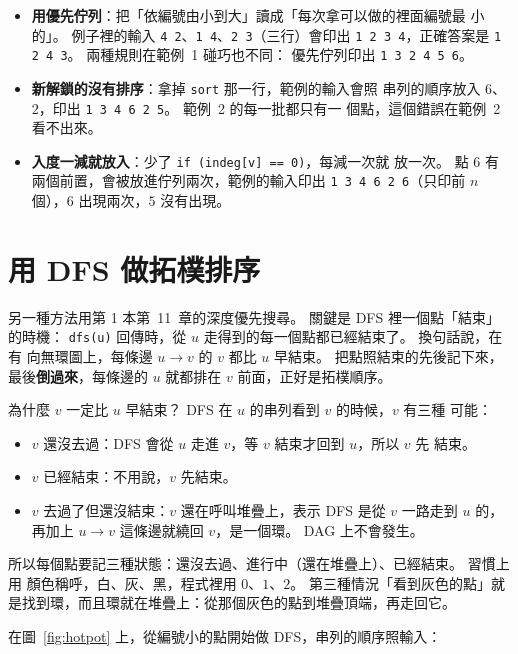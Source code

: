 \begin{itemize}
\item \textbf{用優先佇列}：把「依編號由小到大」讀成「每次拿可以做的裡面編號最
小的」。 例子裡的輸入 \texttt{4 2}、\texttt{1 4}、\texttt{2 3}（三行）會印出
\texttt{1 2 3 4}，正確答案是 \texttt{1 2 4 3}。 兩種規則在範例~1 碰巧也不同：
優先佇列印出 \texttt{1 3 2 4 5 6}。
\item \textbf{新解鎖的沒有排序}：拿掉 \texttt{sort} 那一行，範例的輸入會照
串列的順序放入 $6$、$2$，印出 \texttt{1 3 4 6 2 5}。 範例~2 的每一批都只有一
個點，這個錯誤在範例~2 看不出來。
\item \textbf{入度一減就放入}：少了 \texttt{if (indeg[v] == 0)}，每減一次就
放一次。 點 $6$ 有兩個前置，會被放進佇列兩次，範例的輸入印出
\texttt{1 3 4 6 2 6}（只印前 $n$ 個），$6$ 出現兩次，$5$ 沒有出現。
\end{itemize}

\section{用 DFS 做拓樸排序}
\label{sec:dfs-topo}

另一種方法用第 1 本第~11~章的深度優先搜尋。 關鍵是 DFS 裡一個點「結束」的時機：
\texttt{dfs(u)} 回傳時，從 $u$ 走得到的每一個點都已經結束了。 換句話說，在有
向無環圖上，每條邊 $u \to v$ 的 $v$ 都比 $u$ 早結束。 把點照結束的先後記下來，
最後\textbf{倒過來}，每條邊的 $u$ 就都排在 $v$ 前面，正好是拓樸順序。

為什麼 $v$ 一定比 $u$ 早結束？ DFS 在 $u$ 的串列看到 $v$ 的時候，$v$ 有三種
可能：

\begin{itemize}
\item $v$ 還沒去過：DFS 會從 $u$ 走進 $v$，等 $v$ 結束才回到 $u$，所以 $v$ 先
結束。
\item $v$ 已經結束：不用說，$v$ 先結束。
\item $v$ 去過了但還沒結束：$v$ 還在呼叫堆疊上，表示 DFS 是從 $v$ 一路走到 $u$
的，再加上 $u \to v$ 這條邊就繞回 $v$，是一個環。 DAG 上不會發生。
\end{itemize}

所以每個點要記三種狀態：還沒去過、進行中（還在堆疊上）、已經結束。 習慣上用
顏色稱呼，白、灰、黑，程式裡用 $0$、$1$、$2$。 第三種情況「看到灰色的點」就
是找到環，而且環就在堆疊上：從那個灰色的點到堆疊頂端，再走回它。

在圖~\ref{fig:hotpot} 上，從編號小的點開始做 DFS，串列的順序照輸入：

